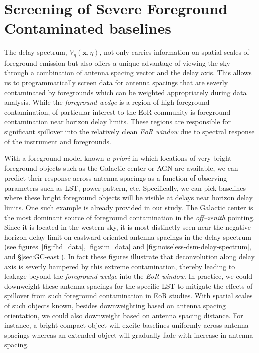 \documentclass[preprint2,iop,numberedappendix]{emulateapj}
\begin{document}

\section{Screening of Severe Foreground Contaminated baselines}\label{sec:fg-grading}

The delay spectrum, $V_\eta(\overline{\mathbf{x}},\eta)$, not only carries information on spatial scales of foreground emission but also offers a unique advantage of viewing the sky through a combination of antenna spacing vector and the delay axis. This allows us to programmatically screen data for antenna spacings that are severly contaminated by foregrounds which can be weighted appropriately during data analysis. While the {\it foreground wedge} is a region of high foreground contamination, of particular interest to the EoR community is foreground contamination near horizon delay limits. These regions are responsible for significant spillover into the relatively clean {\it EoR window} due to spectral response of the instrument and foregrounds. 

With a foreground model known {\it a priori} in which locations of very bright foreground objects such as the Galactic center or AGN are available, we can predict their response across antenna spacings as a function of observing parameters such as LST, power pattern, etc. Specifically, we can pick baselines where these bright foreground objects will be visible at delays near horizon delay limits. One such example is already provided in our study. The Galactic center is the most dominant source of foreground contamination in the {\it off--zenith} pointing. Since it is located in the western sky, it is most distinctly seen near the negative horizon delay limit on eastward oriented antenna spacings in the delay spectrum (see figures~\ref{fig:fhd_data}, \ref{fig:sim_data} and \ref{fig:noiseless-dsm-delay-spectrum}, and \S\ref{sec:GC-east}). In fact these figures illustrate that deconvolution along delay axis is severly hampered by this extreme contamination, thereby leading to leakage beyond the {\it foreground wedge} into the {\it EoR window}. In practice, we could downweight these antenna spacings for the specific LST to mitigate the effects of spillover from such foreground contamination in EoR studies. With spatial scales of such objects known, besides downweighting based on antenna spacing orientation, we could also downweight based on antenna spacing distance. For instance, a bright compact object will excite baselines uniformly across antenna spacings whereas an extended object will gradually fade with increase in antenna spacing. 
\end{document}
